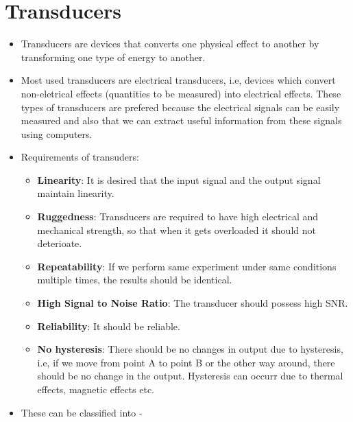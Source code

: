 \documentclass{article}
\begin{document}
\section{Transducers}
	\begin{itemize}
		\item Transducers are devices that converts one physical effect to another by transforming one type of energy to another.
		\item Most used transducers are electrical transducers, i.e, devices which convert non-eletrical effects (quantities to be measured) into electrical effects. These types of transducers are prefered because the electrical signals can be easily measured and also that we can extract useful information from these signals using computers.

		\item Requirements of transuders:
		\begin{itemize}
			\item \textbf{Linearity}: It is desired that the input signal and the output signal maintain linearity.
			\item \textbf{Ruggedness}: Transducers are required to have high electrical and mechanical strength, so that when it gets overloaded it should not deterioate.
			\item \textbf{Repeatability}: If we perform same experiment under same conditions multiple times, the results should be identical.
			\item \textbf{High Signal to Noise Ratio}: The transducer should possess high SNR.
			\item \textbf{Reliability}: It should be reliable.
			\item \textbf{No hysteresis}: There should be no changes in output due to hysteresis, i.e, if we move from point A to point B or the other way around, there should be no change in the output. Hysteresis can occurr due to thermal effects, magnetic effects etc.
		\end{itemize} 

		\item These can be classified into - \\


\end{itemize}
\end{document}
